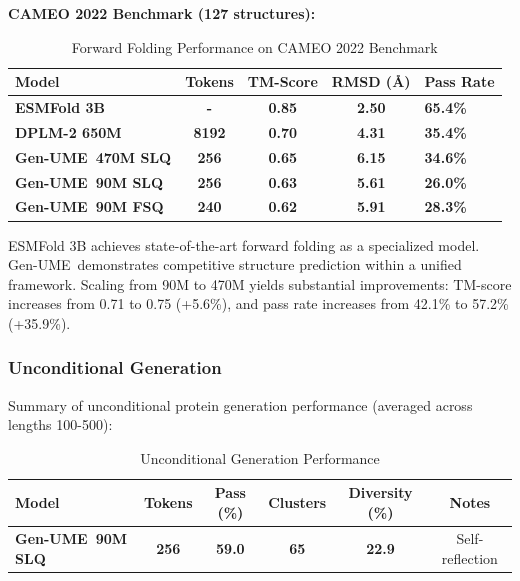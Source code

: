 \documentclass[11pt,a4paper]{article}
\newcommand{\genume}{Gen-UME}
\begin{document}
\textbf{CAMEO 2022 Benchmark (127 structures):}

\begin{table}[h]
\centering
\small
\caption{Forward Folding Performance on CAMEO 2022 Benchmark}
\begin{tabular}{@{}lcccl@{}}
\toprule
\textbf{Model} & \textbf{Tokens} & \textbf{TM-Score} & \textbf{RMSD (Å)} & \textbf{Pass Rate} \\
\midrule
\textbf{ESMFold 3B} \cite{lin2023} & \textbf{-} & \textbf{0.85} & \textbf{2.50} & \textbf{65.4\%} \\
\textbf{DPLM-2 650M} \cite{wang2024} & \textbf{8192} & \textbf{0.70} & \textbf{4.31} & \textbf{35.4\%} \\
\textbf{\genume~470M SLQ} & \textbf{256} & \textbf{0.65} & \textbf{6.15} & \textbf{34.6\%} \\
\textbf{\genume~90M SLQ} & \textbf{256} & \textbf{0.63} & \textbf{5.61} & \textbf{26.0\%} \\
\textbf{\genume~90M FSQ} & \textbf{240} & \textbf{0.62} & \textbf{5.91} & \textbf{28.3\%} \\
\bottomrule
\end{tabular}
\label{tab:forward_folding_cameo}
\end{table}

ESMFold 3B achieves state-of-the-art forward folding as a specialized model. \genume~demonstrates competitive structure prediction within a unified framework. Scaling from 90M to 470M yields substantial improvements: TM-score increases from 0.71 to 0.75 (+5.6\%), and pass rate increases from 42.1\% to 57.2\% (+35.9\%).

\subsubsection{Unconditional Generation}

Summary of unconditional protein generation performance (averaged across lengths 100-500):

\begin{table}[h]
\centering
\caption{Unconditional Generation Performance}
\begin{tabular}{@{}lccccc@{}}
\toprule
\textbf{Model} & \textbf{Tokens} & \textbf{Pass (\%)} & \textbf{Clusters} & \textbf{Diversity (\%)} & \textbf{Notes} \\
\midrule
\textbf{\genume~90M SLQ} & \textbf{256} & \textbf{59.0} & \textbf{65} & \textbf{22.9} & Self-reflection \\
\bottomrule
\end{tabular}
\label{tab:unconditional}
\end{table}
\end{document}
